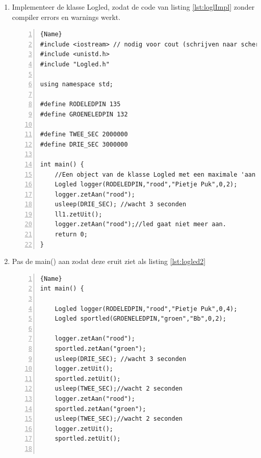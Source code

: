 \begin{enumerate}[label=\alph*]
	\item Implementeer de klasse Logled, zodat de code van listing \ref{lst:loglImpl} zonder compiler errors en warnings werkt.
	\begin{lstlisting}[caption=Een test van de klasse \texttt{LogLed}. ,frame=trbl,firstnumber=1,numbers=left,label={lst:lst:loglImpl}]{Name}
#include <iostream> // nodig voor cout (schrijven naar scherm)
#include <unistd.h>
#include "Logled.h"

using namespace std;

#define RODELEDPIN 135
#define GROENELEDPIN 132

#define TWEE_SEC 2000000
#define DRIE_SEC 3000000

int main() {
	//Een object van de klasse Logled met een maximale 'aan' tijd van 2 seconde 
	Logled logger(RODELEDPIN,"rood","Pietje Puk",0,2);
	logger.zetAan("rood");
	usleep(DRIE_SEC); //wacht 3 seconden
	ll1.zetUit();
	logger.zetAan("rood");//led gaat niet meer aan.
	return 0;
}	
\end{lstlisting}
\item  Pas de main() aan zodat deze eruit ziet als listing \ref{lst:logled2}
\begin{lstlisting}[caption=Twee objecten van de klasse \texttt{LogLed}. ,frame=trbl,firstnumber=1,numbers=left,label={lst:logled2}]{Name}
int main() {
	
	Logled logger(RODELEDPIN,"rood","Pietje Puk",0,4);
	Logled sportled(GROENELEDPIN,"groen","Bb",0,2);
	
	logger.zetAan("rood");
	sportled.zetAan("groen");
	usleep(DRIE_SEC); //wacht 3 seconden
	logger.zetUit();
	sportled.zetUit();
	usleep(TWEE_SEC);//wacht 2 seconden
	logger.zetAan("rood");
	sportled.zetAan("groen");
	usleep(TWEE_SEC);//wacht 2 seconden
	logger.zetUit();
	sportled.zetUit();
	

\end{lstlisting}
\end{enumerate}
